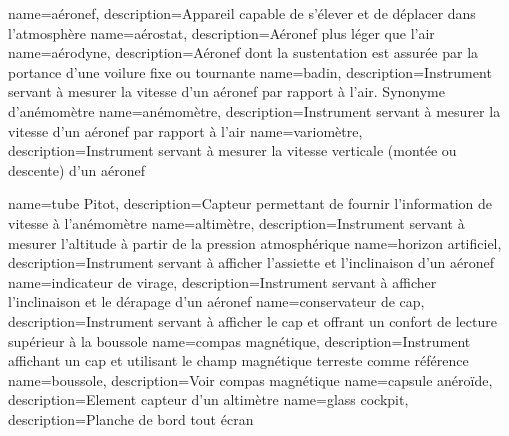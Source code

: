 {
    name=aéronef,
    description={Appareil capable de s'élever et de déplacer dans l'atmosphère}
}
{
    name=aérostat,
    description={Aéronef plus léger que l'air}
}
{
    name=aérodyne,
    description={Aéronef dont la sustentation est assurée par la portance d'une voilure fixe ou tournante}
}
{
    name=badin,
    description={Instrument servant à mesurer la vitesse d'un aéronef par rapport à l'air. Synonyme d'anémomètre}
}
{
    name=anémomètre,
    description={Instrument servant à mesurer la vitesse d'un aéronef par rapport à l'air}
}
{
    name=variomètre,
    description={Instrument servant à mesurer la vitesse verticale (montée ou descente) d'un aéronef}
}

{
    name=tube Pitot,
    description={Capteur permettant de fournir l'information de vitesse à l'anémomètre}
}
{
    name=altimètre,
    description={Instrument servant à mesurer l'altitude à partir de la pression atmosphérique}
}
{
    name=horizon artificiel,
    description={Instrument servant à afficher l'assiette et l'inclinaison d'un aéronef}
}
{
    name=indicateur de virage,
    description={Instrument servant à afficher l'inclinaison et le dérapage d'un aéronef}
}
{
    name=conservateur de cap,
    description={Instrument servant à afficher le cap et offrant un confort de lecture supérieur à la boussole}
}
{
    name=compas magnétique,
    description={Instrument affichant un cap et utilisant le champ magnétique terreste comme référence}
}
{
    name=boussole,
    description={Voir compas magnétique}
}
{
    name=capsule anéroïde,
    description={Element capteur d'un altimètre}
}
{
    name=glass cockpit,
    description={Planche de bord tout écran}
}






